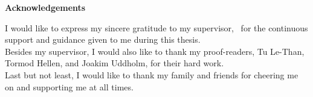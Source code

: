 \noindent \textbf{Acknowledgements}
\thispagestyle{empty}
\vspace*{1cm}

\noindent
I would like to express my sincere gratitude to my supervisor, \firstsupervisor \, for the continuous support and guidance given to me during this thesis.\\

\medskip\noindent
Besides my supervisor, I would also like to thank my proof-readers, Tu Le-Than, Tormod Hellen, and Joakim Uddholm, for their hard work.\\

\medskip\noindent
Last but not least, I would like to thank my family and friends for cheering me on and supporting me at all times.

\addtocounter{page}{-1}